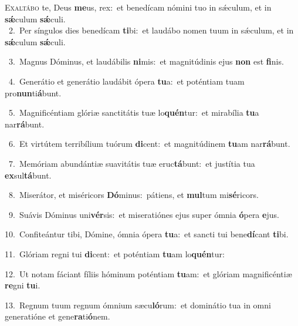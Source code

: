 \lettrine{\initial\textcolor{\initialcolor}{E}}{xaltábo} te, Deus \textbf{me}\-us, rex:~\star et benedícam nómini tuo in sǽculum, et in \textbf{sǽ}\-culum \textbf{sǽ}\-culi.\\
{\numbfont\textcolor{\numbcolor}{~2.}}~Per síngulos dies benedícam \textbf{ti}\-bi:~\star et laudábo nomen tuum in sǽculum, et in \textbf{sǽ}\-culum \textbf{sǽ}\-culi.\par
{\numbfont\textcolor{\numbcolor}{~3.}}~Magnus Dóminus, et laudábilis \textbf{ni}\-mis:~\star et magnitúdinis ejus \textbf{non} est \textbf{fi}\-nis.\par
{\numbfont\textcolor{\numbcolor}{~4.}}~Generátio et generátio laudábit ópera \textbf{tu}\-a:~\star et poténtiam tuam pro\-\textbf{nun}\-ti\-\textbf{á}\-bunt.\par
{\numbfont\textcolor{\numbcolor}{~5.}}~Magnificéntiam glóriæ sanctitátis tuæ lo\-\textbf{quén}\-tur:~\star et mirabília \textbf{tu}\-a nar\-\textbf{rá}\-bunt.\par
{\numbfont\textcolor{\numbcolor}{~6.}}~Et virtútem terribílium tuórum \textbf{di}\-cent:~\star et magnitúdinem \textbf{tu}\-am nar\-\textbf{rá}\-bunt.\par
{\numbfont\textcolor{\numbcolor}{~7.}}~Memóriam abundántiæ suavitátis tuæ eruc\-\textbf{tá}\-bunt:~\star et justítia tua \textbf{ex}\-sul\-\textbf{tá}\-bunt.\par
{\numbfont\textcolor{\numbcolor}{~8.}}~Miserátor, et miséricors \textbf{Dó}\-minus:~\star pátiens, et \textbf{mul}\-tum mi\-\textbf{sé}\-ricors.\par
{\numbfont\textcolor{\numbcolor}{~9.}}~Suávis Dóminus uni\-\textbf{vér}\-sis:~\star et miseratiónes ejus super ómnia \textbf{ó}\-pera \textbf{e}\-jus.\par
{\numbfont\textcolor{\numbcolor}{10.}}~Confiteántur tibi, Dómine, ómnia ópera \textbf{tu}\-a:~\star et sancti tui bene\-\textbf{dí}\-cant \textbf{ti}\-bi.\par
{\numbfont\textcolor{\numbcolor}{11.}}~Glóriam regni tui \textbf{di}\-cent:~\star et poténtiam \textbf{tu}\-am lo\-\textbf{quén}\-tur:\par
{\numbfont\textcolor{\numbcolor}{12.}}~Ut notam fáciant fíliis hóminum poténtiam \textbf{tu}\-am:~\star et glóriam magnificéntiæ \textbf{re}\-gni \textbf{tu}\-i.\par
{\numbfont\textcolor{\numbcolor}{13.}}~Regnum tuum regnum ómnium sæcu\-\textbf{ló}\-rum:~\star et dominátio tua in omni generatióne et gene\-\textbf{ra}\-ti\-\textbf{ó}\-nem.\par
